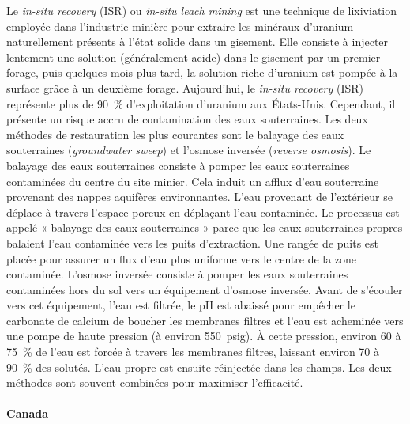 \documentclass{article}
\begin{document}
Le \textit{in-situ recovery} (ISR) ou \textit{in-situ leach mining} est une technique de lixiviation employée dans l’industrie minière pour extraire les minéraux d’uranium naturellement présents à l'état solide dans un gisement. Elle consiste à injecter lentement une solution (généralement acide) dans le gisement par un premier forage, puis quelques mois plus tard, la solution riche d’uranium est pompée à la surface grâce à un deuxième forage. 
Aujourd’hui, le \textit{in-situ recovery} (ISR) représente plus de 90~\% d’exploitation d’uranium aux États-Unis. Cependant, il présente un risque accru de contamination des eaux souterraines.
Les deux méthodes de restauration les plus courantes sont le balayage des eaux souterraines (\textit{groundwater sweep}) et l'osmose inversée (\textit{reverse osmosis}).
Le balayage des eaux souterraines consiste à pomper les eaux souterraines contaminées du centre du site minier. Cela induit un afflux d'eau souterraine provenant des nappes aquifères environnantes. L'eau provenant de l'extérieur se déplace à travers l'espace poreux en déplaçant l'eau contaminée. Le processus est appelé « balayage des eaux souterraines » parce que les eaux souterraines propres balaient l'eau contaminée vers les puits d’extraction. Une rangée de puits est placée pour assurer un flux d’eau plus uniforme vers le centre de la zone contaminée. %
L'osmose inversée consiste à pomper les eaux souterraines contaminées hors du sol vers un équipement d'osmose inversée. Avant de s'écouler vers cet équipement, l'eau est filtrée, le pH est abaissé pour empêcher le carbonate de calcium de boucher les membranes filtres et l'eau est acheminée vers une pompe de haute pression (à environ 550~psig). À cette pression, environ 60 à 75~\% de l'eau est forcée à travers les membranes filtres, laissant environ 70 à 90~\% des solutés. L'eau propre est ensuite réinjectée dans les champs.
Les deux méthodes sont souvent combinées pour maximiser l’efficacité.


\paragraph{Canada \\ \\}
\end{document}
